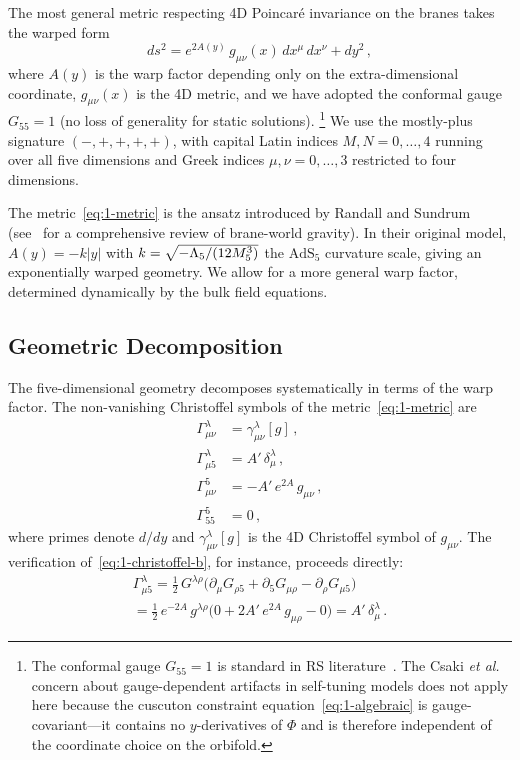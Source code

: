 The most general metric respecting 4D Poincar\'{e} invariance on the branes takes the warped form
\begin{equation}
\label{eq:1-metric}
ds^2 = e^{2A(y)}\, g_{\mu\nu}(x)\, dx^\mu\, dx^\nu + dy^2\,,
\end{equation}
where $A(y)$ is the warp factor depending only on the extra-dimensional coordinate, $g_{\mu\nu}(x)$ is the 4D metric, and we have adopted the conformal gauge $G_{55} = 1$ (no loss of generality for static solutions).%
\footnote{The conformal gauge $G_{55} = 1$ is standard in RS literature~\cite{ch1:rs1}. The Csaki \textit{et al.}~\cite{ch1:csaki00} concern about gauge-dependent artifacts in self-tuning models does not apply here because the cuscuton constraint equation~\eqref{eq:1-algebraic} is gauge-covariant---it contains no $y$-derivatives of $\Phi$ and is therefore independent of the coordinate choice on the orbifold.}
We use the mostly-plus signature $(-,+,+,+,+)$, with capital Latin indices $M, N = 0,\ldots,4$ running over all five dimensions and Greek indices $\mu, \nu = 0,\ldots,3$ restricted to four dimensions.

The metric~\eqref{eq:1-metric} is the ansatz introduced by Randall and Sundrum~\cite{ch1:rs1} (see~\cite{ch1:maartens04} for a comprehensive review of brane-world gravity). In their original model, $A(y) = -k|y|$ with $k = \sqrt{-\Lambda_5/(12M_5^3)}$ the $\mathrm{AdS}_5$ curvature scale, giving an exponentially warped geometry. We allow for a more general warp factor, determined dynamically by the bulk field equations.

\subsection{Geometric Decomposition}
\label{sec:1-decomposition}

The five-dimensional geometry decomposes systematically in terms of the warp factor. The non-vanishing Christoffel symbols of the metric~\eqref{eq:1-metric} are
\begin{subequations}
\label{eq:1-christoffel}
\begin{align}
\Gamma^\lambda_{\mu\nu} &= \gamma^\lambda_{\mu\nu}[g]\,, \label{eq:1-christoffel-a}\\
\Gamma^\lambda_{\mu 5} &= A'\, \delta^\lambda_\mu\,, \label{eq:1-christoffel-b}\\
\Gamma^5_{\mu\nu} &= -A'\, e^{2A}\, g_{\mu\nu}\,, \label{eq:1-christoffel-c}\\
\Gamma^5_{55} &= 0\,, \label{eq:1-christoffel-d}
\end{align}
\end{subequations}
where primes denote $d/dy$ and $\gamma^\lambda_{\mu\nu}[g]$ is the 4D Christoffel symbol of $g_{\mu\nu}$. The verification of~\eqref{eq:1-christoffel-b}, for instance, proceeds directly:
\begin{multline}
\label{eq:1-christoffel-verify}
\Gamma^\lambda_{\mu 5} = \tfrac{1}{2}\, G^{\lambda\rho}\bigl(\partial_\mu G_{\rho 5} + \partial_5 G_{\mu\rho} - \partial_\rho G_{\mu 5}\bigr) \\
= \tfrac{1}{2}\, e^{-2A}\, g^{\lambda\rho}\bigl(0 + 2A'\, e^{2A}\, g_{\mu\rho} - 0\bigr)
= A'\, \delta^\lambda_\mu\,.
\end{multline}

